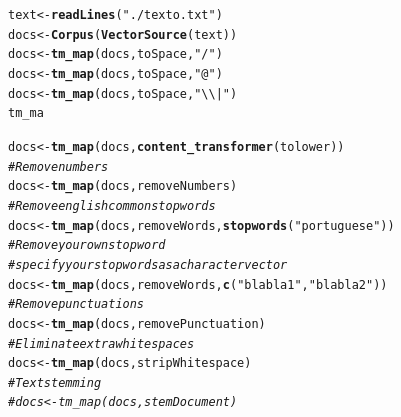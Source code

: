\documentclass[12pt,a4paper]{article}\usepackage[]{graphicx}\usepackage[]{color}
\makeatletter
\newcommand{\hlstr}[1]{\textcolor[rgb]{0.192,0.494,0.8}{#1}}%
\newcommand{\hlcom}[1]{\textcolor[rgb]{0.678,0.584,0.686}{\textit{#1}}}%
\newcommand{\hlstd}[1]{\textcolor[rgb]{0.345,0.345,0.345}{#1}}%
\newcommand{\hlkwb}[1]{\textcolor[rgb]{0.69,0.353,0.396}{#1}}%
\newcommand{\hlkwd}[1]{\textcolor[rgb]{0.737,0.353,0.396}{\textbf{#1}}}%
\newenvironment{kframe}{%
 \def\at@end@of@kframe{}%
 \ifinner\ifhmode%
  \def\at@end@of@kframe{\end{minipage}}%
  \begin{minipage}{\columnwidth}%
 \fi\fi%
 \def\FrameCommand##1{\hskip\@totalleftmargin \hskip-\fboxsep
 \colorbox{shadecolor}{##1}\hskip-\fboxsep
     \hskip-\linewidth \hskip-\@totalleftmargin \hskip\columnwidth}%
 \MakeFramed {\advance\hsize-\width
   \@totalleftmargin\z@ \linewidth\hsize
   \@setminipage}}%
 {\par\unskip\endMakeFramed%
 \at@end@of@kframe}
\newenvironment{knitrout}{}{} %
\makeatother
\begin{document}
\begin{knitrout}\small
{}\color{fgcolor}\begin{kframe}
\begin{alltt}
\hlstd{text} \hlkwb{<-} \hlkwd{readLines}\hlstd{(}\hlstr{"./texto.txt"}\hlstd{)}
\hlstd{docs} \hlkwb{<-} \hlkwd{Corpus}\hlstd{(}\hlkwd{VectorSource}\hlstd{(text))}
\hlstd{docs} \hlkwb{<-} \hlkwd{tm_map}\hlstd{(docs, toSpace,} \hlstr{"/"}\hlstd{)}
\hlstd{docs} \hlkwb{<-} \hlkwd{tm_map}\hlstd{(docs, toSpace,} \hlstr{"@"}\hlstd{)}
\hlstd{docs} \hlkwb{<-} \hlkwd{tm_map}\hlstd{(docs, toSpace,} \hlstr{"\textbackslash{}\textbackslash{}|"}\hlstd{)}
\hlstd{tm_ma}
\end{alltt}


{\ttfamily\noindent\bfseries\color{errorcolor}{\#\# Error in eval(expr, envir, enclos): objeto 'tm\_ma' não encontrado}}\begin{alltt}
\hlstd{docs} \hlkwb{<-} \hlkwd{tm_map}\hlstd{(docs,} \hlkwd{content_transformer}\hlstd{(tolower))}
\hlcom{# Remove numbers}
\hlstd{docs} \hlkwb{<-} \hlkwd{tm_map}\hlstd{(docs, removeNumbers)}
\hlcom{# Remove english common stopwords}
\hlstd{docs} \hlkwb{<-} \hlkwd{tm_map}\hlstd{(docs, removeWords,} \hlkwd{stopwords}\hlstd{(}\hlstr{"portuguese"}\hlstd{))}
\hlcom{# Remove your own stop word}
\hlcom{# specify your stopwords as a character vector}
\hlstd{docs} \hlkwb{<-} \hlkwd{tm_map}\hlstd{(docs, removeWords,} \hlkwd{c}\hlstd{(}\hlstr{"blabla1"}\hlstd{,} \hlstr{"blabla2"}\hlstd{))}
\hlcom{# Remove punctuations}
\hlstd{docs} \hlkwb{<-} \hlkwd{tm_map}\hlstd{(docs, removePunctuation)}
\hlcom{# Eliminate extra white spaces}
\hlstd{docs} \hlkwb{<-} \hlkwd{tm_map}\hlstd{(docs, stripWhitespace)}
\hlcom{# Text stemming}
\hlcom{# docs <- tm_map(docs, stemDocument)}


\end{alltt}
\end{kframe}
\end{knitrout}
\end{document}
